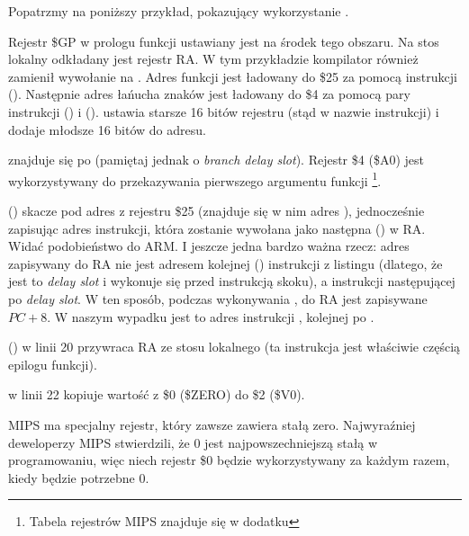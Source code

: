 Popatrzmy na poniższy przykład, pokazujący wykorzystanie .



Rejestr \$GP w prologu funkcji ustawiany jest na środek tego obszaru.
Na stos lokalny odkładany jest rejestr \ac{RA}.
W tym przykładzie kompilator również zamienił wywołanie \printf na \puts.
Adres funkcji \puts jest ładowany do \$25 za pomocą instrukcji  ().
Następnie adres łańucha znaków jest ładowany do \$4 za pomocą pary instrukcji  () i
 ().
 ustawia starsze 16 bitów rejestru (stąd  w nazwie instrukcji) i 
dodaje młodsze 16 bitów do adresu.

 znajduje się po  (pamiętaj jednak o \emph{branch delay slot}).
Rejestr \$4 (\$A0) jest wykorzystywany do przekazywania pierwszego argumentu funkcji
\footnote{Tabela rejestrów MIPS znajduje się w dodatku }.


 () skacze pod adres z rejestru \$25 (znajduje się w nim adres \puts),
jednocześnie zapisując adres instrukcji, która zostanie wywołana jako następna () w \ac{RA}.
Widać podobieństwo do ARM.
I jeszcze jedna bardzo ważna rzecz: adres zapisywany do \ac{RA} nie jest adresem kolejnej () instrukcji z listingu (dlatego, że jest to
\emph{delay slot} i wykonuje się przed instrukcją skoku),
a instrukcji następującej po \emph{delay slot}.
W ten sposób, podczas wykonywania , do \ac{RA} jest zapisywane $PC + 8$.
W naszym wypadku jest to adres instrukcji , kolejnej po .

 () w linii 20 przywraca \ac{RA} ze stosu lokalnego (ta instrukcja jest właściwie częścią epilogu funkcji).

 w linii 22 kopiuje wartość z \$0 (\$ZERO) do \$2 (\$V0).

\label{MIPS_zero_register}
MIPS ma specjalny rejestr, który zawsze zawiera stałą zero.
Najwyraźniej deweloperzy MIPS stwierdzili, że 0 jest najpowszechniejszą stałą w programowaniu, więc niech rejestr \$0 będzie wykorzystywany za każdym razem, kiedy będzie potrzebne 0.

